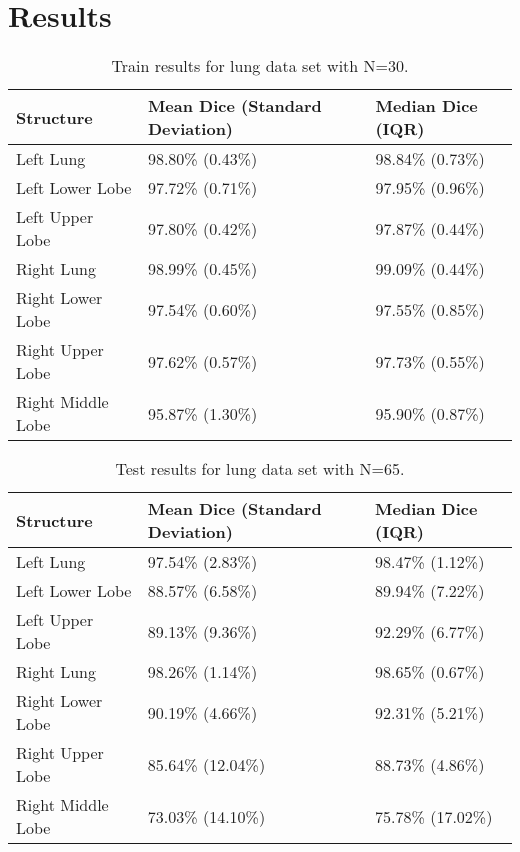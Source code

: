 \documentclass[11pt]{article}
\begin{document}
\section{Results}
\begin{table}[H]
\centering
\begin{tabular}{@{}lll@{}}
\toprule
Structure & Mean Dice (Standard Deviation) & Median Dice (IQR) \\ \midrule
Left Lung & 98.80\% (0.43\%) & 98.84\% (0.73\%) \\
Left Lower Lobe & 97.72\% (0.71\%) & 97.95\% (0.96\%) \\
Left Upper Lobe & 97.80\% (0.42\%) & 97.87\% (0.44\%) \\
Right Lung & 98.99\% (0.45\%) & 99.09\% (0.44\%) \\
Right Lower Lobe & 97.54\% (0.60\%) & 97.55\% (0.85\%) \\
Right Upper Lobe & 97.62\% (0.57\%) & 97.73\% (0.55\%) \\
Right Middle Lobe & 95.87\% (1.30\%) & 95.90\% (0.87\%) \\ \bottomrule
\end{tabular}
\caption{Train results for lung data set with N=30.}
\label{lung-train}
\end{table}
\begin{table}[H]
\centering
\begin{tabular}{@{}lll@{}}
\toprule
Structure & Mean Dice (Standard Deviation) & Median Dice (IQR) \\ \midrule
Left Lung & 97.54\% (2.83\%) & 98.47\% (1.12\%) \\
Left Lower Lobe & 88.57\% (6.58\%) & 89.94\% (7.22\%) \\
Left Upper Lobe & 89.13\% (9.36\%) & 92.29\% (6.77\%) \\
Right Lung & 98.26\% (1.14\%) & 98.65\% (0.67\%) \\
Right Lower Lobe & 90.19\% (4.66\%) & 92.31\% (5.21\%) \\
Right Upper Lobe & 85.64\% (12.04\%) & 88.73\% (4.86\%) \\
Right Middle Lobe & 73.03\% (14.10\%) & 75.78\% (17.02\%) \\ \bottomrule
\end{tabular}
\caption{Test results for lung data set with N=65.}
\label{lung-test}
\end{table}
\end{document}
